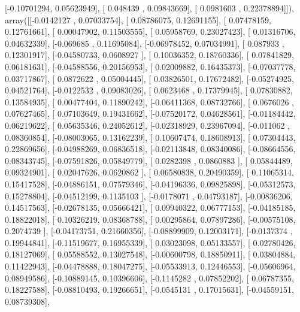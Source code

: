 \documentclass{article}
\begin{document}
       [-0.10701294,  0.05623949],
       [ 0.048439  ,  0.09843669],
       [ 0.0981603 ,  0.22378894]]), array([[-0.0142127 ,  0.07033754],
       [ 0.08786075,  0.12691155],
       [ 0.07478159,  0.12761661],
       [ 0.00047902,  0.11503555],
       [ 0.05958769,  0.23027423],
       [ 0.01316706,  0.04632339],
       [-0.069685  ,  0.11695084],
       [-0.06978452,  0.07034991],
       [ 0.087933  ,  0.12301917],
       [-0.04580733,  0.0608927 ],
       [ 0.10036352,  0.18760336],
       [ 0.07841829,  0.06181631],
       [-0.04588556,  0.20156953],
       [ 0.02009882,  0.16435373],
       [-0.07037778,  0.03717867],
       [ 0.0872622 ,  0.05004445],
       [ 0.03826501,  0.17672482],
       [-0.05274925,  0.04521764],
       [-0.0122532 ,  0.09083026],
       [ 0.0623468 ,  0.17379945],
       [ 0.07830882,  0.13584935],
       [ 0.00477404,  0.11890242],
       [-0.06411368,  0.08732766],
       [ 0.0676026 ,  0.07627465],
       [ 0.07103649,  0.19431662],
       [-0.07520172,  0.04628561],
       [-0.01184442,  0.06219622],
       [ 0.05635346,  0.24052612],
       [-0.02318929,  0.23967094],
       [-0.011062  ,  0.08360854],
       [-0.08003065,  0.13162239],
       [ 0.10607474,  0.18608913],
       [ 0.07304443,  0.22869656],
       [-0.04988269,  0.06836518],
       [-0.02113848,  0.08340086],
       [-0.08664556,  0.08343745],
       [-0.07591826,  0.05849779],
       [ 0.0282398 ,  0.0860883 ],
       [ 0.05844489,  0.09324901],
       [ 0.02047626,  0.0620862 ],
       [ 0.06580838,  0.20490359],
       [ 0.11065314,  0.15417528],
       [-0.04886151,  0.07579346],
       [-0.04196336,  0.09825898],
       [-0.05312573,  0.15278804],
       [-0.04512199,  0.1135103 ],
       [-0.0178071 ,  0.04793187],
       [-0.00836206,  0.14517563],
       [-0.02678135,  0.05666421],
       [ 0.09940322,  0.06777153],
       [-0.04185185,  0.18822018],
       [ 0.10326219,  0.08368788],
       [ 0.00295864,  0.07897286],
       [-0.00575108,  0.2074739 ],
       [-0.04173751,  0.21660356],
       [-0.08899909,  0.12003171],
       [-0.0137374 ,  0.19944841],
       [-0.11519677,  0.16955339],
       [ 0.03023098,  0.05133557],
       [ 0.02780426,  0.18127069],
       [ 0.05588552,  0.13027548],
       [-0.00600798,  0.18850911],
       [ 0.03804884,  0.11422943],
       [-0.04478888,  0.18047275],
       [-0.05533913,  0.12446553],
       [-0.05606964,  0.08949586],
       [-0.10889145,  0.10396606],
       [-0.1145282 ,  0.07852202],
       [ 0.06787355,  0.18227588],
       [-0.08810493,  0.19266651],
       [-0.0545131 ,  0.17015631],
       [-0.04559151,  0.08739308],
\end{document}
